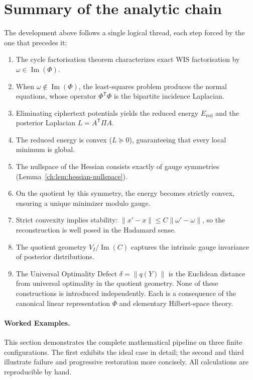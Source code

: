 \section{Summary of the analytic chain}\label{ch:sec:summary-of-the-analytic-chain}
The development above follows a single logical thread, each step forced by the one that precedes it:
\begin{enumerate}
\item The cycle factorisation theorem characterizes exact WIS factorisation by $\omega\in\operatorname{Im}(\Phi)$.
\item When $\omega\notin\operatorname{Im}(\Phi)$, the least-squares problem produces the normal equations, whose operator $\Phi^{\mathsf T}\Phi$ is the bipartite incidence Laplacian.
\item Eliminating ciphertext potentials yields the reduced energy $E_{\mathrm{red}}$ and the posterior Laplacian $L=A^{\mathsf T}\Pi A$.
\item The reduced energy is convex ($L\succeq0$), guaranteeing that every local minimum is global.
\item The nullspace of the Hessian consists exactly of gauge symmetries (Lemma~\ref{ch:lem:hessian-nullspace}).
\item On the quotient by this symmetry, the energy becomes strictly convex, ensuring a unique minimizer modulo gauge.
\item Strict convexity implies stability: $\|x'-x\|\le C\|\omega'-\omega\|$, so the reconstruction is well posed in the Hadamard sense.
\item The quotient geometry $V_I/\operatorname{Im}(C)$ captures the intrinsic gauge invariance of posterior distributions.
\item The Universal Optimality Defect $\delta=\|q(Y)\|$ is the Euclidean distance from universal optimality in the quotient geometry.
None of these constructions is introduced independently.  Each is a consequence of the canonical linear representation $\Phi$ and elementary Hilbert-space theory.
\end{enumerate}

\paragraph{Worked Examples.}
\label{ch:sec:worked-examples}
This section demonstrates the complete mathematical pipeline on three
finite configurations.  The first exhibits the ideal case in detail;
the second and third illustrate failure and progressive restoration
more concisely.  All calculations are reproducible by hand.



